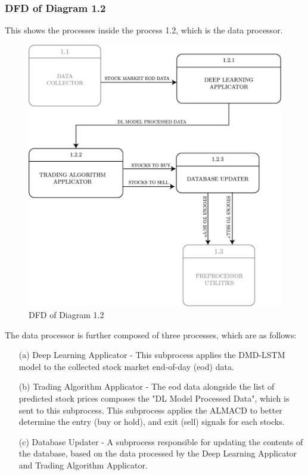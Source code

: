 \subsubsection{DFD of Diagram 1.2}
\label{subsubsec: dfd1.2}
This shows the processes inside the process 1.2, which is the data processor.
\begin{figure}[ht]
    \centering
    \includegraphics[width=1\textwidth]{./assets/Chapter_3/DFD/DFD_1.2.png}
    \caption{DFD of Diagram 1.2}
    \label{fig:dfd1.2}
\end{figure}
\FloatBarrier

The data processor is further composed of three processes, which are as follows:
\begin{itemize}
    \item[(a)] Deep Learning Applicator - This subprocess applies the DMD-LSTM model to 
    the collected stock market end-of-day (eod) data.
    \item[(b)] Trading Algorithm Applicator - The eod data alongside the list of predicted stock prices
    composes the "DL Model Processed Data", which is sent to this subprocess. This subprocess applies
    the ALMACD to better determine the entry (buy or hold), and exit (sell) signals for each stocks.
    \item[(c)] Database Updater - A subprocess responsible for updating the contents of the database, 
    based on the data processed by the Deep Learning Applicator and Trading Algorithm Applicator.
\end{itemize}


